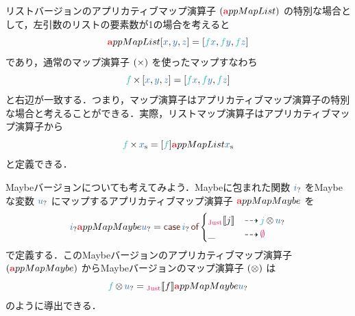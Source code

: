 \documentclass[a5paper,twoside,fleqn,draft]{jsbook}
\begin{document}
リストバージョンのアプリカティブマップ演算子 $(\hTypeName{a}ppMapList)$ の特別な場合として，左引数のリストの要素数が1の場合を考えると
\begin{equation}
  [\hFunc{f}]\hTypeName{a}ppMapList{}[\hVar{x},\hVar{y},\hVar{z}]
  =[\hFunc{f}\hVar{x},\hFunc{f}\hVar{y},\hFunc{f}\hVar{z}]
\end{equation}
であり，通常のマップ演算子 $(\operatorname{\times})$ を使ったマップすなわち
\begin{equation}
  \hFunc{f}\hMap{}[\hVar{x},\hVar{y},\hVar{z}]
  =[\hFunc{f}\hVar{x},\hFunc{f}\hVar{y},\hFunc{f}\hVar{z}]
\end{equation}
と右辺が一致する．つまり，マップ演算子はアプリカティブマップ演算子の特別な場合と考えることができる．実際，リストマップ演算子はアプリカティブマップ演算子から
\begin{equation}
  \hFunc{f}\hMap\hListVar{x}
  =[\hFunc{f}]\hTypeName{a}ppMapList\hListVar{x}
\end{equation}
と定義できる．

Maybeバージョンについても考えてみよう．Maybeに包まれた関数 $\hMaybeVar{i}$ をMaybeな変数 $\hMaybeVar{u}$ にマップするアプリカティブマップ演算子
$\hTypeName{a}ppMapMaybe$ を
\begin{equation}
  \hMaybeVar{i}\hTypeName{a}ppMapMaybe\hMaybeVar{u}
  =\hCaseSyntax{\hMaybeVar{i}}
  \begin{cases}
    \hJustWith{j}
    &\hIfSo\mJFunc\hMaybeMap\hMaybeVar{u}\\
    \_
    &\hIfSo\hNothing
  \end{cases}
\end{equation}
で定義する．このMaybeバージョンのアプリカティブマップ演算子 $(\hTypeName{a}ppMapMaybe)$ からMaybeバージョンのマップ演算子 $(\operatorname{\otimes})$ は
\begin{equation}
  \hFunc{f}\hMaybeMap\hMaybeVar{u}
  =\hJustWith{f}\hTypeName{a}ppMapMaybe\hMaybeVar{u}
\end{equation}
のように導出できる．
\end{document}

